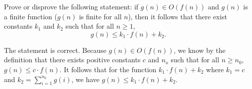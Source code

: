 \begin{flex}
\begin{exercise}
Prove or disprove the following statement:
%
if $g(n) \in O(f(n))$ and $g(n)$ is a finite function ($g(n)$ is finite
for all $n$), then it follows that there exist constants $k_1$ and
$k_2$ such that for all $n \geq 1$,
\[
g(n) \leq k_1\cdot f(n) + k_2.
\]
\end{exercise}

\begin{solution}
The statement is correct. 
%
Because $g(n) \in O(f(n))$, we know by the definition that there exists positive constants $c$ and $n_o$ such that for all $n \geq n_0$, $g(n) \le c \cdot f(n)$.
%
It follows that for the function $k_1 \cdot f(n) + k_2$ where  $k_1 = c$ and $k_2 = \sum_{i=1}^{n_0}  g(i)$,  we have $g(n) \leq k_1 \cdot f(n) + k_2$.
\end{solution}

\end{flex}




